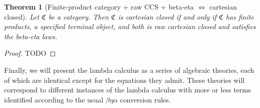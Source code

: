 \documentclass[12pt,twoside]{reedthesis}
\theoremstyle{definition}
\theoremstyle{remark}
\theoremstyle{plain}
\newtheorem{theorem}{Theorem}
\begin{document}
\begin{theorem}[Finite-product category + raw CCS + beta-eta $\iff$ cartesian closed]\label{thm:rawbetaetaisccs}
  Let \( \mathfrak{C} \) be a category. Then \( \mathfrak{C}\) is cartesian
  closed if and only if \( \mathfrak{C} \) has finite products, a specified
  terminal object, and both is raw cartesian closed and satisfies the beta-eta
  laws.
\end{theorem}
\begin{proof}
  TODO
\end{proof}

Finally, we will present the lambda calculus as a series of algebraic theories,
each of which are identical except for the equations they admit. These theories
will correspond to different instances of the lambda calculus with more or less
terms identified according to the usual \( \beta\eta\alpha \) conversion rules.
\end{document}
